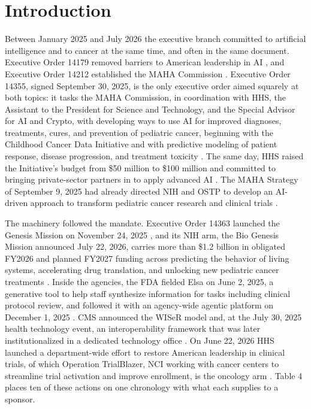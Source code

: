 \section{Introduction}
\label{sec:introduction}

Between January 2025 and July 2026 the executive branch committed to artificial
intelligence and to cancer at the same time, and often in the same document.
Executive Order 14179 removed barriers to American leadership in AI
\cite{eo14179}, and Executive Order 14212 established the MAHA Commission
\cite{eo14212}. Executive Order 14355, signed September 30, 2025, is the only
executive order aimed squarely at both topics: it tasks the MAHA Commission, in
coordination with HHS, the Assistant to the President for Science and
Technology, and the Special Advisor for AI and Crypto, with developing ways to
use AI for improved diagnoses, treatments, cures, and prevention of pediatric
cancer, beginning with the Childhood Cancer Data Initiative and with predictive
modeling of patient response, disease progression, and treatment toxicity
\cite{eo14355, eo14355app, akin_eo14355}. The same day, HHS raised the
Initiative's budget from \$50 million to \$100 million and committed to bringing
private-sector partners in to apply advanced AI \cite{ccdidoubling_nih}. The
MAHA Strategy of September 9, 2025 had already directed NIH and OSTP to develop
an AI-driven approach to transform pediatric cancer research and clinical trials
\cite{maha_strategy}.

The machinery followed the mandate. Executive Order 14363 launched the Genesis
Mission on November 24, 2025 \cite{eo14363, doe_genesis_launch}, and its NIH arm,
the Bio Genesis Mission announced July 22, 2026, carries more than \$1.2 billion
in obligated FY2026 and planned FY2027 funding across predicting the behavior of
living systems, accelerating drug translation, and unlocking new pediatric
cancer treatments \cite{biogenesis_nih, hpcwire_genesis}. Inside the agencies,
the FDA fielded Elsa on June 2, 2025, a generative tool to help staff synthesize
information for tasks including clinical protocol review, and followed it with
an agency-wide agentic platform on December 1, 2025
\cite{crs_ai_healthcare, hhs_ai_strategy}. CMS announced the WISeR model and,
at the July 30, 2025 health technology event, an interoperability framework that
was later institutionalized in a dedicated technology office
\cite{cms_healthtech, cms_office_healthtech}. On June 22, 2026 HHS launched a
department-wide effort to restore American leadership in clinical trials, of
which Operation TrialBlazer, NCI working with cancer centers to streamline trial
activation and improve enrollment, is the oncology arm
\cite{trialblazer, hhstrialblazer2026}. Table 4 places ten of these actions on
one chronology with what each supplies to a sponsor.

